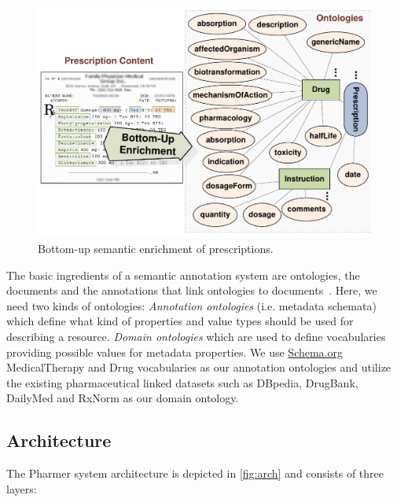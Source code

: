 \documentclass[conference]{IEEEtran}
\begin{document}
\begin{figure}[tb]
	\centering
		\includegraphics[width=1.0\columnwidth]{images/approaches.pdf}
	\caption{Bottom-up semantic enrichment of prescriptions.}
	\label{fig:botup}
\end{figure}

The basic ingredients of a semantic annotation system are ontologies, the documents and the annotations that link ontologies to documents~\cite{khalili2012}.
Here, we need two kinds of ontologies:
\emph{Annotation ontologies} (i.e. metadata schemata) which define what kind of properties and value types should be used for describing a resource.
\emph{Domain ontologies} which are used to define vocabularies providing possible values for metadata properties.
We use \url{Schema.org} MedicalTherapy and Drug vocabularies as our annotation ontologies and utilize the existing pharmaceutical linked datasets such as DBpedia, DrugBank, DailyMed and RxNorm as our domain ontology.


\subsection{Architecture}

The Pharmer system architecture is depicted in \autoref{fig:arch} and consists of three layers:
\end{document}
